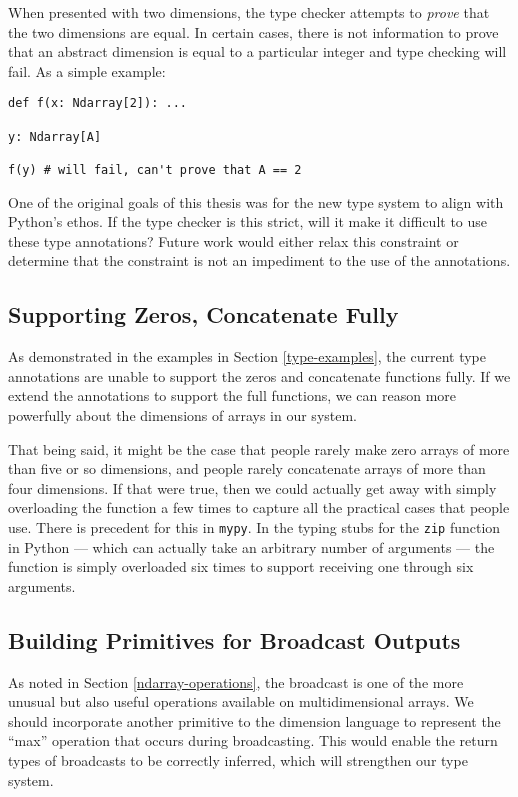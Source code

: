 \documentclass[12pt]{report}
\begin{document}
When presented with two dimensions, the type checker attempts to \textit{prove} that the two dimensions are equal. In certain cases, there is not information to prove that an abstract dimension is equal to a particular integer and type checking will fail. As a simple example:

\begin{singlespace*}
    \begin{verbatim}
def f(x: Ndarray[2]): ...

y: Ndarray[A]

f(y) # will fail, can't prove that A == 2\end{verbatim}
\end{singlespace*}

One of the original goals of this thesis was for the new type system to align with Python's ethos. If the type checker is this strict, will it make it difficult to use these type annotations? Future work would either relax this constraint or determine that the constraint is not an impediment to the use of the annotations.

\subsection{Supporting Zeros, Concatenate Fully}

As demonstrated in the examples in Section \ref{type-examples}, the current type annotations are unable to support the zeros and concatenate functions fully. If we extend the annotations to support the full functions, we can reason more powerfully about the dimensions of arrays in our system.

That being said, it might be the case that people rarely make zero arrays of more than five or so dimensions, and people rarely concatenate arrays of more than four dimensions. If that were true, then we could actually get away with simply overloading the function a few times to capture all the practical cases that people use. There is precedent for this in \texttt{mypy}. In the typing stubs for the \texttt{zip} function in Python --- which can actually take an arbitrary number of arguments --- the function is simply overloaded six times to support receiving one through six arguments.

\subsection{Building Primitives for Broadcast Outputs}

As noted in Section \ref{ndarray-operations}, the broadcast is one of the more unusual but also useful operations available on multidimensional arrays. We should incorporate another primitive to the dimension language to represent the ``max'' operation that occurs during broadcasting. This would enable the return types of broadcasts to be correctly inferred, which will strengthen our type system.
\end{document}
